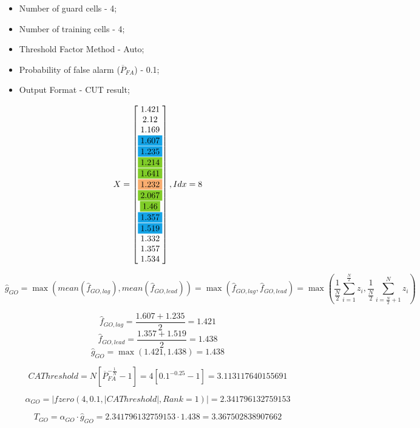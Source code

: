 \documentclass[a4paper,11pt]{article}
\begin{document}
			\begin{itemize}
				\item Number of guard cells - 4; 
				\item Number of training cells - 4;
				\item Threshold Factor Method - Auto;
				\item Probability of false alarm ($\overline{P}_{FA}$) - 0.1;
				\item Output Format - CUT result;
			\end{itemize}
			
			$$X = 
			\begin{bmatrix}
				1.421\\
				2.12\\
				1.169\\
				\colorbox{Cerulean}{1.607}\\
				\colorbox{Cerulean}{1.235}\\
				\colorbox{LimeGreen}{1.214}\\
				\colorbox{LimeGreen}{1.641}\\
				\colorbox{Apricot}{1.232}\\
				\colorbox{LimeGreen}{2.067}\\
				\colorbox{LimeGreen}{1.46}\\
				\colorbox{Cerulean}{1.357}\\
				\colorbox{Cerulean}{1.519}\\
				1.332\\
				1.357\\
				1.534
			\end{bmatrix}, Idx = 8
			$$
			
			$$ \widehat{g}_{GO} = \max(mean(\widehat{f}_{GO,lag}), mean(\widehat{f}_{GO,lead})) = \max(\widehat{f}_{GO,lag}, \widehat{f}_{GO,lead}) = \max\left(\frac{1}{\frac{N}{2}}\sum_{i = 1}^{\frac{N}{2}}z_{i},\frac{1}{\frac{N}{2}}\sum_{i = \frac{N}{2} + 1}^{N}z_{i}\right)$$
			
			$$ \widehat{f}_{GO,lag} = \frac{1.607 + 1.235}{2} = 1.421$$ 
			$$ \widehat{f}_{GO,lead} = \frac{1.357 + 1.519}{2} = 1.438$$ 
			$$ \widehat{g}_{GO} = \max(1.421, 1.438) = 1.438 $$
			
			$$ CAThreshold = N \left[\overline{P}_{FA}^{-\frac{1}{N}} - 1\right] = 4 \left[0.1^{-0.25} - 1\right] = 3.113117640155691$$
			
			$$ \alpha_{GO} = |fzero(4, 0.1, |CAThreshold|, Rank=1)| = 2.341796132759153$$ 
			
			$$ T_{GO} = \alpha_{GO}\cdot \widehat{g}_{GO} = 2.341796132759153 \cdot 1.438 = 3.367502838907662$$
			
\end{document}
